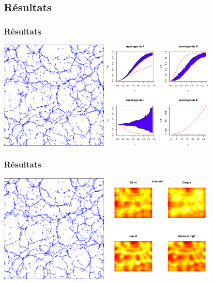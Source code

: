 \documentclass{beamer}
\theoremstyle{remark}
\theoremstyle{plain}
\begin{document}
\subsection{Résultats}
\begin{frame}
  \frametitle{Résultats}
  \includegraphics[height=5.5cm]{images/exempleConfiguration.png}
   \hspace{0.5cm}
  \includegraphics[height=5.5cm]{images/resultat.png}
\end{frame}

\begin{frame}
  \frametitle{Résultats}
  \includegraphics[height=5.5cm]{images/exempleConfiguration.png}
  \hspace{0.5cm}
  \includegraphics[height=5.5cm]{images/resultatIntensite.png}
\end{frame}
\end{document}
